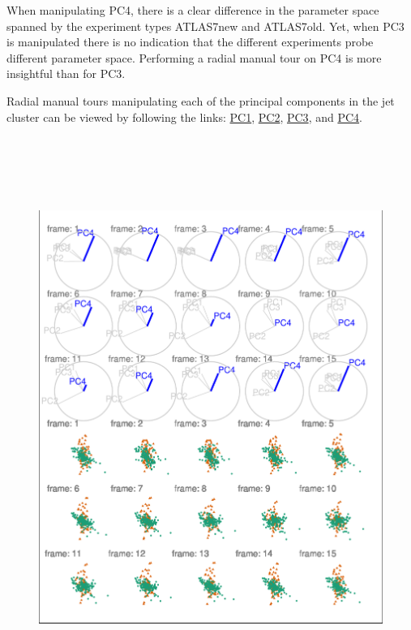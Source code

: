 When manipulating PC4, there is a clear difference in the parameter
space spanned by the experiment types ATLAS7new and ATLAS7old. Yet, when
PC3 is manipulated there is no indication that the different experiments
probe different parameter space. Performing a radial manual tour on PC4
is more insightful than for PC3.

Radial manual tours manipulating each of the principal components in the
jet cluster can be viewed by following the links:
\href{https://nspyrison.netlify.com/thesis/jetcluster_manualtour_pc1/}{PC1},
\href{https://nspyrison.netlify.com/thesis/jetcluster_manualtour_pc2/}{PC2},
\href{https://nspyrison.netlify.com/thesis/jetcluster_manualtour_pc3/}{PC3},
and
\href{https://nspyrison.netlify.com/thesis/jetcluster_manualtour_pc4/}{PC4}.

\begin{Schunk}
\begin{figure}

{\centering \includegraphics[width=6in,height=7.2in]{spinifex_paper_files/figure-latex/JetClusterGood-1} 

}
\end{figure}
\end{Schunk}
